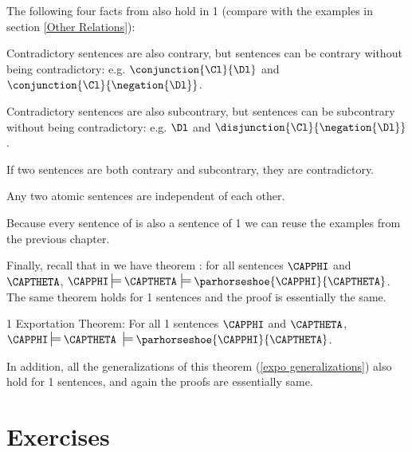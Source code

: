 The following four facts from \GSL{} also hold in \GQL{}1 (compare with the examples in section \ref{Other Relations}):

\begin{cenumerate}
	\item Contradictory sentences are also contrary, but sentences can be contrary without being contradictory: e.g. $\conjunction{\Cl}{\Dl}$ and $\conjunction{\Cl}{\negation{\Dl}}$.
	\item Contradictory sentences are also subcontrary, but sentences can be subcontrary without being contradictory: e.g. $\Dl$ and $\disjunction{\Cl}{\negation{\Dl}}$.
	\item If two sentences are both contrary and subcontrary, they are contradictory.
	\item Any two atomic sentences are independent of each other.
\end{cenumerate}

\noindent{}Because every sentence of \GSL{} is also a sentence of \GQL{}1 we can reuse the examples from the previous chapter. 

Finally, recall that in \GSL{} we have theorem : for all \GSL{} sentences $\CAPPHI$ and $\CAPTHETA$, $\CAPPHI\sdtstile{}{}\CAPTHETA$ \Iff $\sdtstile{}{}\parhorseshoe{\CAPPHI}{\CAPTHETA}$. 
The same theorem holds for \GQL{}1 sentences and the proof is essentially the same. 
\begin{THEOREM}{ \GQL{}1 Exportation Theorem:} For all \GQL{}1 sentences $\CAPPHI$ and $\CAPTHETA$, $\CAPPHI\sdtstile{}{}\CAPTHETA$ \Iff $\:\sdtstile{}{}\parhorseshoe{\CAPPHI}{\CAPTHETA}$.
\end{THEOREM}
\noindent{}In addition, all the generalizations of this theorem (\ref{expo generalizations}) also hold for \GQL{}1 sentences, and again the proofs are essentially same.


\section{Exercises}

